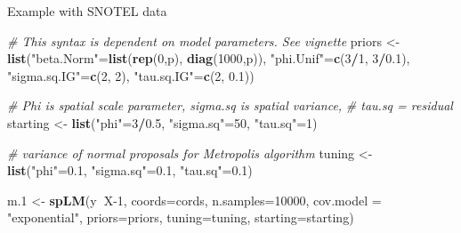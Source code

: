 \documentclass[ignorenonframetext,]{beamer}
\newenvironment{Shaded}{\begin{snugshade}}{\end{snugshade}}
\newcommand{\CommentTok}[1]{\textcolor[rgb]{0.56,0.35,0.01}{\textit{#1}}}
\newcommand{\DataTypeTok}[1]{\textcolor[rgb]{0.13,0.29,0.53}{#1}}
\newcommand{\DecValTok}[1]{\textcolor[rgb]{0.00,0.00,0.81}{#1}}
\newcommand{\FloatTok}[1]{\textcolor[rgb]{0.00,0.00,0.81}{#1}}
\newcommand{\KeywordTok}[1]{\textcolor[rgb]{0.13,0.29,0.53}{\textbf{#1}}}
\newcommand{\NormalTok}[1]{#1}
\newcommand{\OperatorTok}[1]{\textcolor[rgb]{0.81,0.36,0.00}{\textbf{#1}}}
\newcommand{\StringTok}[1]{\textcolor[rgb]{0.31,0.60,0.02}{#1}}
\begin{document}
\begin{frame}[fragile]{Example with SNOTEL data}
\protect\hypertarget{example-with-snotel-data-1}{}

\begin{Shaded}
\begin{Highlighting}[]
\CommentTok{# This syntax is dependent on model parameters. See vignette}
\NormalTok{priors <-}\StringTok{ }\KeywordTok{list}\NormalTok{(}\StringTok{"beta.Norm"}\NormalTok{=}\KeywordTok{list}\NormalTok{(}\KeywordTok{rep}\NormalTok{(}\DecValTok{0}\NormalTok{,p), }
  \KeywordTok{diag}\NormalTok{(}\DecValTok{1000}\NormalTok{,p)), }\StringTok{"phi.Unif"}\NormalTok{=}\KeywordTok{c}\NormalTok{(}\DecValTok{3}\OperatorTok{/}\DecValTok{1}\NormalTok{, }\DecValTok{3}\OperatorTok{/}\FloatTok{0.1}\NormalTok{), }
  \StringTok{"sigma.sq.IG"}\NormalTok{=}\KeywordTok{c}\NormalTok{(}\DecValTok{2}\NormalTok{, }\DecValTok{2}\NormalTok{), }\StringTok{"tau.sq.IG"}\NormalTok{=}\KeywordTok{c}\NormalTok{(}\DecValTok{2}\NormalTok{, }\FloatTok{0.1}\NormalTok{))}

\CommentTok{# Phi is spatial scale parameter, sigma.sq is spatial variance, }
\CommentTok{# tau.sq = residual}
\NormalTok{starting <-}\StringTok{ }\KeywordTok{list}\NormalTok{(}\StringTok{"phi"}\NormalTok{=}\DecValTok{3}\OperatorTok{/}\FloatTok{0.5}\NormalTok{, }\StringTok{"sigma.sq"}\NormalTok{=}\DecValTok{50}\NormalTok{, }\StringTok{"tau.sq"}\NormalTok{=}\DecValTok{1}\NormalTok{)}

\CommentTok{# variance of normal proposals for Metropolis algorithm}
\NormalTok{tuning <-}\StringTok{ }\KeywordTok{list}\NormalTok{(}\StringTok{"phi"}\NormalTok{=}\FloatTok{0.1}\NormalTok{, }\StringTok{"sigma.sq"}\NormalTok{=}\FloatTok{0.1}\NormalTok{, }\StringTok{"tau.sq"}\NormalTok{=}\FloatTok{0.1}\NormalTok{)}

\NormalTok{m}\FloatTok{.1}\NormalTok{ <-}\StringTok{ }\KeywordTok{spLM}\NormalTok{(y}\OperatorTok{~}\NormalTok{X}\DecValTok{-1}\NormalTok{, }\DataTypeTok{coords=}\NormalTok{cords, }
  \DataTypeTok{n.samples=}\DecValTok{10000}\NormalTok{, }
  \DataTypeTok{cov.model =} \StringTok{"exponential"}\NormalTok{, }\DataTypeTok{priors=}\NormalTok{priors, }
  \DataTypeTok{tuning=}\NormalTok{tuning, }\DataTypeTok{starting=}\NormalTok{starting)}
\end{Highlighting}
\end{Shaded}

\end{frame}
\end{document}
